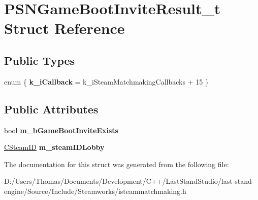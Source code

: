 \hypertarget{structPSNGameBootInviteResult__t}{}\section{P\+S\+N\+Game\+Boot\+Invite\+Result\+\_\+t Struct Reference}
\label{structPSNGameBootInviteResult__t}
\subsection*{Public Types}
\begin{DoxyCompactItemize}
\item 
\hypertarget{structPSNGameBootInviteResult__t_ab17c2d0fbcdbb303c3429ec45c11b871}{}enum \{ {\bfseries k\+\_\+i\+Callback} = k\+\_\+i\+Steam\+Matchmaking\+Callbacks + 15
 \}\label{structPSNGameBootInviteResult__t_ab17c2d0fbcdbb303c3429ec45c11b871}

\end{DoxyCompactItemize}
\subsection*{Public Attributes}
\begin{DoxyCompactItemize}
\item 
\hypertarget{structPSNGameBootInviteResult__t_aa4eecdb30a11e49cd05c49ec48a990c3}{}bool {\bfseries m\+\_\+b\+Game\+Boot\+Invite\+Exists}\label{structPSNGameBootInviteResult__t_aa4eecdb30a11e49cd05c49ec48a990c3}

\item 
\hypertarget{structPSNGameBootInviteResult__t_aef8a05cf9051ddb70c354905884ddbe6}{}\hyperlink{classCSteamID}{C\+Steam\+I\+D} {\bfseries m\+\_\+steam\+I\+D\+Lobby}\label{structPSNGameBootInviteResult__t_aef8a05cf9051ddb70c354905884ddbe6}

\end{DoxyCompactItemize}


The documentation for this struct was generated from the following file\+:\begin{DoxyCompactItemize}
\item 
D\+:/\+Users/\+Thomas/\+Documents/\+Development/\+C++/\+Last\+Stand\+Studio/last-\/stand-\/engine/\+Source/\+Include/\+Steamworks/isteammatchmaking.\+h\end{DoxyCompactItemize}
